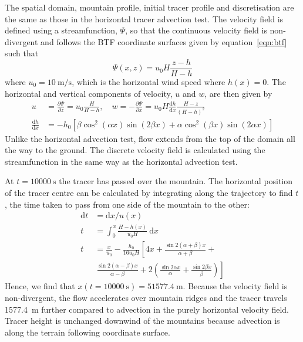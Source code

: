 \documentclass[draft]{ametsoc}
\begin{document}
The spatial domain, mountain profile, initial tracer profile and discretisation are the same as those in the horizontal tracer advection test.  The velocity field is defined using a streamfunction, $\Psi$, so that the continuous velocity field is non-divergent and follows the BTF coordinate surfaces given by equation~\ref{eqn:btf} such that
\begin{equation}
	\Psi(x,z) = u_0 H \frac{z - h}{H - h} \label{eqn:streamfunc-btf}
\end{equation}
where $u_0 = \SI{10}{\meter\per\second}$, which is the horizontal wind speed where $h(x) = 0$.
The horizontal and vertical components of velocity, $u$ and $w$, are then given by
\begin{align}
	u &= \frac{\partial \Psi}{\partial z} = u_0 \frac{H}{H - h}, \quad w = -\frac{\partial \Psi}{\partial x} = u_0 H \frac{\mathrm{d} h}{\mathrm{d} x} \frac{H - z}{\left( H - h \right)^2} \label{eqn:uw-btf} \\
	\frac{\mathrm{d} h}{\mathrm{d} x} &= - h_0 \left[ 
		\beta \cos^2 \left( \alpha x \right) \sin \left( 2 \beta x \right) +
		\alpha \cos^2 \left( \beta x \right) \sin \left( 2 \alpha x \right)
	\right]
\end{align}
Unlike the horizontal advection test, flow extends from the top of the domain all the way to the ground.  The discrete velocity field is calculated using the streamfunction in the same way as the horizontal advection test.

At $t = \SI{10000}{\second}$ the tracer has passed over the mountain.  The horizontal position of the tracer centre can be calculated by integrating along the trajectory to find $t$, the time taken to pass from one side of the mountain to the other:
\begin{align}
	\mathrm{d}t &= \mathrm{d}x / u(x) \\
	t &= \int_0^x \frac{H - h(x)}{u_0 H}\:\mathrm{d}x \\
	t &= \frac{x}{u_0} - \frac{h_0}{16 u_0 H} \left[ 4x + \frac{\sin 2 (\alpha + \beta) x}{\alpha + \beta} \right.+ \nonumber \\
   &\ \left. \frac{\sin 2(\alpha - \beta) x}{\alpha - \beta} + 2 \left( \frac{\sin 2\alpha x}{\alpha} + \frac{\sin 2\beta x}{\beta} \right) \right]
\end{align}
Hence, we find that \(x(t=\SI{10000}{\second}) = \SI{51577.4}{\meter}\).  Because the velocity field is non-divergent, the flow accelerates over mountain ridges and the tracer travels \SI{1577.4}{\meter} further compared to advection in the purely horizontal velocity field.  Tracer height is unchanged downwind of the mountains because advection is along the terrain following coordinate surface.
\end{document}
